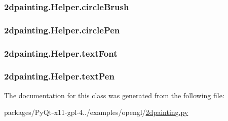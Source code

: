 \subsubsection[{circle\+Brush}]{\setlength{\rightskip}{0pt plus 5cm}2dpainting.\+Helper.\+circle\+Brush}\label{class2dpainting_1_1Helper_abc1fbb88b9c85b4751ace5734a54842f}
\hypertarget{class2dpainting_1_1Helper_a751be71e1d38c9229ed11cf856db4289}{}
\subsubsection[{circle\+Pen}]{\setlength{\rightskip}{0pt plus 5cm}2dpainting.\+Helper.\+circle\+Pen}\label{class2dpainting_1_1Helper_a751be71e1d38c9229ed11cf856db4289}
\hypertarget{class2dpainting_1_1Helper_aaa679b100cd6f7d1668a564775377693}{}
\subsubsection[{text\+Font}]{\setlength{\rightskip}{0pt plus 5cm}2dpainting.\+Helper.\+text\+Font}\label{class2dpainting_1_1Helper_aaa679b100cd6f7d1668a564775377693}
\hypertarget{class2dpainting_1_1Helper_a3e738110b25b650e700580c59445a60e}{}
\subsubsection[{text\+Pen}]{\setlength{\rightskip}{0pt plus 5cm}2dpainting.\+Helper.\+text\+Pen}\label{class2dpainting_1_1Helper_a3e738110b25b650e700580c59445a60e}


The documentation for this class was generated from the following file\+:\begin{DoxyCompactItemize}
\item 
packages/\+Py\+Qt-\/x11-\/gpl-\/4../examples/opengl/\hyperlink{2dpainting_8py}{2dpainting.\+py}\end{DoxyCompactItemize}
